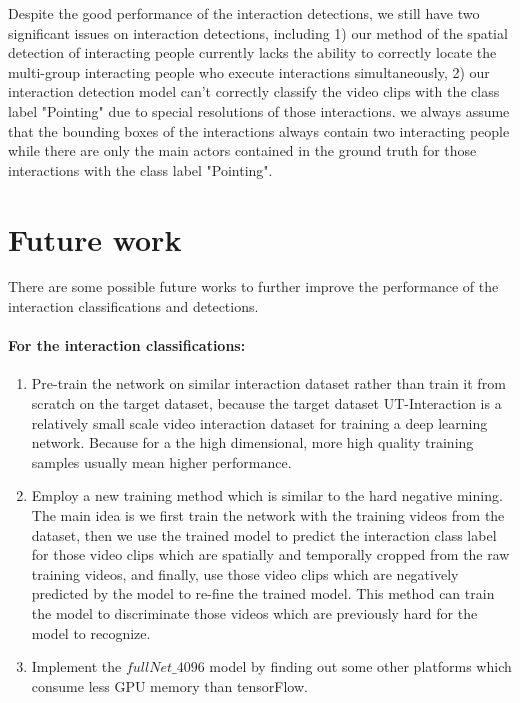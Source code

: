 \par 
Despite the good performance of the interaction detections, we still have two significant issues on interaction detections, including 1) our method of the spatial detection of interacting people currently lacks the ability to correctly locate the multi-group interacting people who execute interactions simultaneously, 2) our interaction detection model can't correctly classify the video clips with the class label "Pointing" due to special resolutions of those interactions. we always assume that the bounding boxes of the interactions always contain two interacting people while there are only the main actors contained in the ground truth for those interactions with the class label "Pointing".    

\section{Future work}
There are some possible future works to further improve the performance of the interaction classifications and detections. 
\par 
\paragraph{For the interaction classifications: }
\begin{enumerate}
	\item Pre-train the network on similar interaction dataset rather than train it from scratch on the target dataset, because the target dataset UT-Interaction is a relatively small scale video interaction dataset for training a deep learning network. Because for a the high dimensional, more high quality training samples usually mean higher performance.  
	\item Employ a new training method which is similar to the hard negative mining. The main idea is we first train the network with the training videos from the dataset, then we use the trained model to predict the interaction class label for those video clips which are spatially and temporally cropped from the raw training videos, and finally, use those video clips which are negatively predicted by the model to re-fine the trained model. This method can train the model to discriminate those videos which are previously hard for the model to recognize.   
	\item Implement the \(fullNet\_4096\) model by finding out some other platforms which consume less GPU memory than tensorFlow.
\end{enumerate}

